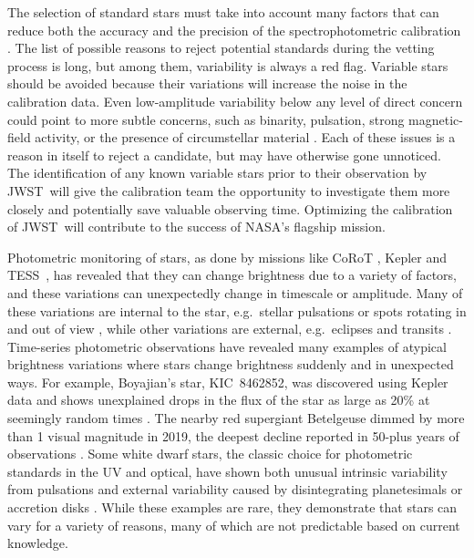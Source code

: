 \documentclass[twocolumn]{aastex631}
\newcommand{\webb}{JWST}
\newcommand{\tess}{TESS}
\begin{document}
The selection of standard stars must take into account many factors that can reduce both the accuracy and the precision of the spectrophotometric calibration \citep[e.g.][]{Sloan2015}.  The list of possible reasons to reject potential standards during the vetting process is long, but among them, variability is always a red flag.  Variable stars should be avoided because their variations will increase the noise in the calibration data.  Even low-amplitude variability below any level of direct concern could point to more subtle concerns, such as binarity, pulsation, strong magnetic-field activity, or the presence of circumstellar material \citep{Bohlin2014PASP126}. Each of these issues is a reason in itself to reject a candidate, but may have otherwise gone unnoticed.  The identification of any known variable stars prior to their observation by \webb\ will give the calibration team the opportunity to investigate them more closely and potentially save valuable observing time.  Optimizing the calibration of \webb\ will contribute to the success of NASA's flagship mission.

Photometric monitoring of stars, as done by missions like CoRoT \citep{corot}, Kepler \citep{Koch2010} and \tess\ \citep{Ricker2015}, has revealed that they can change brightness due to a variety of factors, and these variations can unexpectedly change in timescale or amplitude. Many of these variations are internal to the star, e.g.\ stellar pulsations or spots rotating in and out of view \citep[e.g.][]{Berger1979deltaScuti, Mcquillan2014}, while other variations are external, e.g.\ eclipses and transits \citep[e.g.][]{prsa2011, Thompson2018}. Time-series photometric observations have revealed many examples of atypical brightness variations where stars change brightness suddenly and in unexpected ways.  For example, Boyajian's star, KIC~8462852, was discovered using Kepler data and shows unexplained drops in the flux of the star as large as 20\% at seemingly random times \citep{Boyajian2016MNRAS}.  The nearby red supergiant Betelgeuse dimmed by more than 1 visual magnitude in 2019, the deepest decline reported in 50-plus years of observations \citep{Betelgeuse2021Natur594,Cotton2020RNAAS4}.  Some white dwarf stars, the classic choice for photometric standards in the UV and optical, have shown both unusual intrinsic variability from pulsations \citep[e.g.][]{Provencal2009ApJGD358,Kilic2015ApJ,Hermes2017MNRAS} and external variability caused by disintegrating planetesimals \citep[as large as 40\%][]{Vanderburg2015Natur,Guidry2021} or accretion disks \citep{Scaringi2021Nat}.  While these examples are rare, they demonstrate that stars can vary for a variety of reasons, many of which are not predictable based on current knowledge.  
\end{document}
